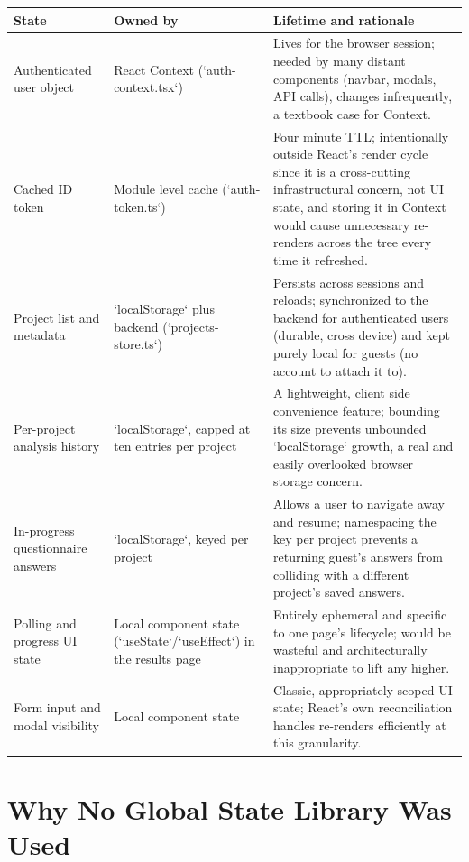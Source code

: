 \documentclass[11pt,a4paper]{report}
\begin{document}
\begin{longtable}{p{4.0cm}p{3.4cm}p{4.6cm}}
\toprule
\textbf{State} & \textbf{Owned by} & \textbf{Lifetime and rationale} \\
\midrule
\endhead
Authenticated user object & React Context (`auth-context.tsx`) & Lives for the browser session; needed by many distant components (navbar, modals, API calls), changes infrequently, a textbook case for Context. \\
Cached ID token & Module level cache (`auth-token.ts`) & Four minute TTL; intentionally outside React's render cycle since it is a cross-cutting infrastructural concern, not UI state, and storing it in Context would cause unnecessary re-renders across the tree every time it refreshed. \\
Project list and metadata & `localStorage` plus backend (`projects-store.ts`) & Persists across sessions and reloads; synchronized to the backend for authenticated users (durable, cross device) and kept purely local for guests (no account to attach it to). \\
Per-project analysis history & `localStorage`, capped at ten entries per project & A lightweight, client side convenience feature; bounding its size prevents unbounded `localStorage` growth, a real and easily overlooked browser storage concern. \\
In-progress questionnaire answers & `localStorage`, keyed per project & Allows a user to navigate away and resume; namespacing the key per project prevents a returning guest's answers from colliding with a different project's saved answers. \\
Polling and progress UI state & Local component state (`useState`/`useEffect`) in the results page & Entirely ephemeral and specific to one page's lifecycle; would be wasteful and architecturally inappropriate to lift any higher. \\
Form input and modal visibility & Local component state & Classic, appropriately scoped UI state; React's own reconciliation handles re-renders efficiently at this granularity. \\
\bottomrule
\end{longtable}

\section{Why No Global State Library Was Used}
\end{document}

